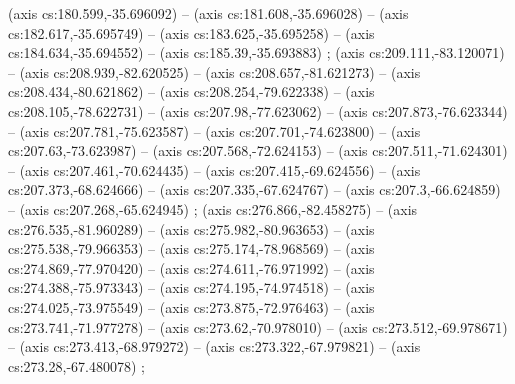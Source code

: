   (axis cs:180.599,-35.696092) --  (axis cs:181.608,-35.696028) --  (axis cs:182.617,-35.695749) --  (axis cs:183.625,-35.695258) --  (axis cs:184.634,-35.694552) --  (axis cs:185.39,-35.693883) ;
    (axis cs:209.111,-83.120071) --  (axis cs:208.939,-82.620525) --  (axis cs:208.657,-81.621273) --  (axis cs:208.434,-80.621862) --  (axis cs:208.254,-79.622338) --  (axis cs:208.105,-78.622731) --  (axis cs:207.98,-77.623062) --  (axis cs:207.873,-76.623344) --  (axis cs:207.781,-75.623587) --  (axis cs:207.701,-74.623800) --  (axis cs:207.63,-73.623987) --  (axis cs:207.568,-72.624153) --  (axis cs:207.511,-71.624301) --  (axis cs:207.461,-70.624435) --  (axis cs:207.415,-69.624556) --  (axis cs:207.373,-68.624666) --  (axis cs:207.335,-67.624767) --  (axis cs:207.3,-66.624859) --  (axis cs:207.268,-65.624945) ;
    (axis cs:276.866,-82.458275) --  (axis cs:276.535,-81.960289) --  (axis cs:275.982,-80.963653) --  (axis cs:275.538,-79.966353) --  (axis cs:275.174,-78.968569) --  (axis cs:274.869,-77.970420) --  (axis cs:274.611,-76.971992) --  (axis cs:274.388,-75.973343) --  (axis cs:274.195,-74.974518) --  (axis cs:274.025,-73.975549) --  (axis cs:273.875,-72.976463) --  (axis cs:273.741,-71.977278) --  (axis cs:273.62,-70.978010) --  (axis cs:273.512,-69.978671) --  (axis cs:273.413,-68.979272) --  (axis cs:273.322,-67.979821) --  (axis cs:273.28,-67.480078) ;
